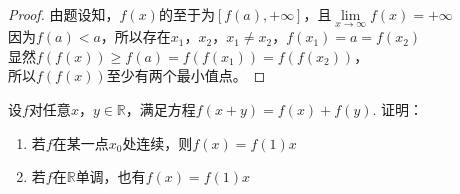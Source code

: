 \begin{proof}
    
    由题设知，$f(x)$的至于为$[f(a),+\infty]$，且$\lim\limits_{x \to \infty}{f(x)} = +\infty$ \\
    因为$f(a)<a$，所以存在$x_1$，$x_2$，$x_1 \neq x_2$，$f(x_1) = a = f(x_2)$ \\
    显然$f(f(x))\geq f(a) = f(f(x_1)) = f(f(x_2))$，\\
    所以$f(f(x))$至少有两个最小值点。

\end{proof}

\begin{proposition}[Cauthy方程]
    
    设$f$对任意$x$，$y \in \mathbb{R}$，满足方程$f(x + y) = f(x) + f(y)$. 证明：

    \begin{enumerate}

        \item 若$f$在某一点$x_0$处连续，则$f(x) = f(1)x$
        
        \item 若$f$在$\mathbb{R}$单调，也有$f(x) = f(1)x$
        
    \end{enumerate}

\end{proposition}

